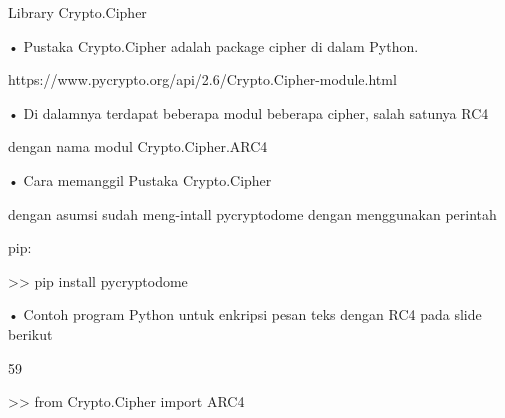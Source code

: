 \documentclass{article}
\begin{document}

Library Crypto.Cipher 

• Pustaka Crypto.Cipher adalah package cipher di dalam Python.

https://www.pycrypto.org/api/2.6/Crypto.Cipher-module.html 

• Di dalamnya terdapat beberapa modul beberapa cipher, salah satunya RC4 

dengan nama modul Crypto.Cipher.ARC4

• Cara memanggil Pustaka Crypto.Cipher

   dengan asumsi sudah meng-intall pycryptodome dengan menggunakan perintah 

pip:

                      >> pip install pycryptodome

• Contoh program Python untuk enkripsi pesan teks dengan RC4 pada slide berikut

59

>> from Crypto.Cipher import ARC4
\end{document}
